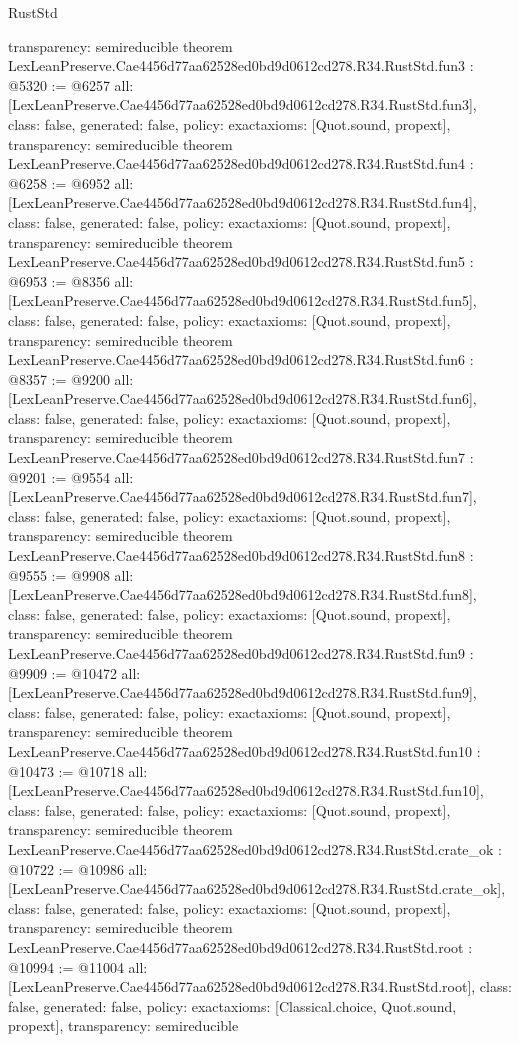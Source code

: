 \begin{lexlean}{RustStd}
\begin{coremodule}
{  transparency: semireducible
}
theorem LexLeanPreserve.Cae4456d77aa62528ed0bd9d0612cd278.R34.RustStd.fun3 : @5320 := @6257 {
  all: [LexLeanPreserve.Cae4456d77aa62528ed0bd9d0612cd278.R34.RustStd.fun3],
  class: false,
  generated: false,
  policy: exact{axioms: [Quot.sound, propext]},
  transparency: semireducible
}
theorem LexLeanPreserve.Cae4456d77aa62528ed0bd9d0612cd278.R34.RustStd.fun4 : @6258 := @6952 {
  all: [LexLeanPreserve.Cae4456d77aa62528ed0bd9d0612cd278.R34.RustStd.fun4],
  class: false,
  generated: false,
  policy: exact{axioms: [Quot.sound, propext]},
  transparency: semireducible
}
theorem LexLeanPreserve.Cae4456d77aa62528ed0bd9d0612cd278.R34.RustStd.fun5 : @6953 := @8356 {
  all: [LexLeanPreserve.Cae4456d77aa62528ed0bd9d0612cd278.R34.RustStd.fun5],
  class: false,
  generated: false,
  policy: exact{axioms: [Quot.sound, propext]},
  transparency: semireducible
}
theorem LexLeanPreserve.Cae4456d77aa62528ed0bd9d0612cd278.R34.RustStd.fun6 : @8357 := @9200 {
  all: [LexLeanPreserve.Cae4456d77aa62528ed0bd9d0612cd278.R34.RustStd.fun6],
  class: false,
  generated: false,
  policy: exact{axioms: [Quot.sound, propext]},
  transparency: semireducible
}
theorem LexLeanPreserve.Cae4456d77aa62528ed0bd9d0612cd278.R34.RustStd.fun7 : @9201 := @9554 {
  all: [LexLeanPreserve.Cae4456d77aa62528ed0bd9d0612cd278.R34.RustStd.fun7],
  class: false,
  generated: false,
  policy: exact{axioms: [Quot.sound, propext]},
  transparency: semireducible
}
theorem LexLeanPreserve.Cae4456d77aa62528ed0bd9d0612cd278.R34.RustStd.fun8 : @9555 := @9908 {
  all: [LexLeanPreserve.Cae4456d77aa62528ed0bd9d0612cd278.R34.RustStd.fun8],
  class: false,
  generated: false,
  policy: exact{axioms: [Quot.sound, propext]},
  transparency: semireducible
}
theorem LexLeanPreserve.Cae4456d77aa62528ed0bd9d0612cd278.R34.RustStd.fun9 : @9909 := @10472 {
  all: [LexLeanPreserve.Cae4456d77aa62528ed0bd9d0612cd278.R34.RustStd.fun9],
  class: false,
  generated: false,
  policy: exact{axioms: [Quot.sound, propext]},
  transparency: semireducible
}
theorem LexLeanPreserve.Cae4456d77aa62528ed0bd9d0612cd278.R34.RustStd.fun10 : @10473 := @10718 {
  all: [LexLeanPreserve.Cae4456d77aa62528ed0bd9d0612cd278.R34.RustStd.fun10],
  class: false,
  generated: false,
  policy: exact{axioms: [Quot.sound, propext]},
  transparency: semireducible
}
theorem LexLeanPreserve.Cae4456d77aa62528ed0bd9d0612cd278.R34.RustStd.crate_ok : @10722 := @10986 {
  all: [LexLeanPreserve.Cae4456d77aa62528ed0bd9d0612cd278.R34.RustStd.crate_ok],
  class: false,
  generated: false,
  policy: exact{axioms: [Quot.sound, propext]},
  transparency: semireducible
}
theorem LexLeanPreserve.Cae4456d77aa62528ed0bd9d0612cd278.R34.RustStd.root : @10994 := @11004 {
  all: [LexLeanPreserve.Cae4456d77aa62528ed0bd9d0612cd278.R34.RustStd.root],
  class: false,
  generated: false,
  policy: exact{axioms: [Classical.choice, Quot.sound, propext]},
  transparency: semireducible
}


\end{coremodule}
\end{lexlean}
